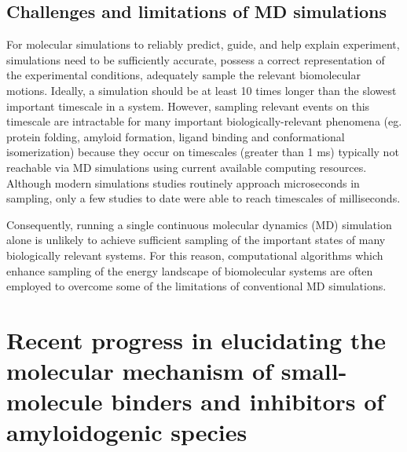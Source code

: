 \subsection{Challenges and limitations of MD simulations}

For molecular simulations to reliably predict, guide, and help explain experiment, simulations need to be sufficiently accurate,  possess a correct representation of the experimental conditions, adequately sample the relevant biomolecular motions.\cite{Mobley:2011ks} Ideally, a simulation should be at least 10 times longer than the slowest important timescale in a system.\cite{Zuckerman:2011dz} However, sampling relevant events on this timescale are intractable for many important biologically-relevant phenomena (eg. protein folding, amyloid formation, ligand binding and conformational isomerization) because they occur on timescales (greater than 1 ms) typically not reachable via MD simulations using current available computing resources.  Although modern simulations studies routinely approach microseconds in sampling, only a few studies to date were able to reach timescales of milliseconds.\cite{Dror:2012cs,Shan:2011bo,LindorffLarsen:2011gl}

Consequently, running a single continuous molecular dynamics (MD) simulation alone is unlikely to achieve sufficient sampling of the important states of many biologically relevant systems. For this reason, computational algorithms which enhance sampling of the energy landscape of biomolecular systems are often employed to overcome some of the limitations of conventional MD simulations.




\section{Recent progress in elucidating the molecular mechanism of small-molecule binders and inhibitors of amyloidogenic species}

